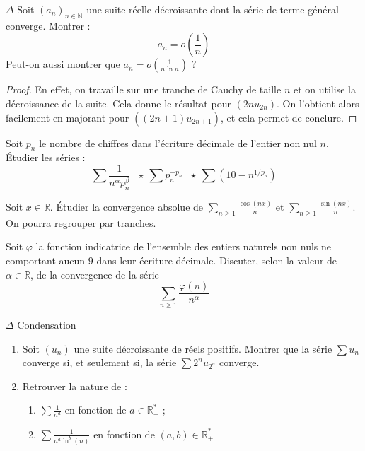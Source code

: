 \documentclass[french,a4paper]{article}
\newcommand{\N}{\mathbb{N}}
\newcommand{\R}{\mathbb{R}}
\newcommand{\st}{^*}
\theoremstyle{plain}
\theoremstyle{definition}
\theoremstyle{remark}
\begin{document}
\begin{ex}[Moulin.14]{$\Delta$} Soit $(a_n)_{n\in\N}$ une suite réelle décroissante dont la série de terme général converge. Montrer : $$a_n=o\left(\frac{1}{n}\right)$$ Peut-on aussi montrer que $a_n=\displaystyle o\left(\frac{1}{n\ln n}\right)$ ?
\end{ex}

\begin{proof}
	En effet, on travaille sur une tranche de Cauchy de taille $n$ et on utilise la décroissance de la suite. Cela donne le résultat pour $(2nu_{2n})$. On l'obtient alors facilement en majorant pour $((2n+1)u_{2n+1})$, et cela permet de conclure.
\end{proof}

\begin{ex}[Moulin.15]{}
	Soit $p_n$ le nombre de chiffres dans l'écriture décimale de l'entier non nul $n$. Étudier les séries : $$ \sum\frac{1}{n^\alpha p_n^\beta}\ \ \ \star\ \sum p_n^{-p_n}\ \ \ \star\ \sum\left(10-n^{1/p_n}\right)$$
\end{ex}

\begin{ex}[Moulin.16]{}
	Soit $x\in\R$. Étudier la convergence absolue de $\displaystyle\sum_{n\geqslant 1}\frac{\cos(nx)}{n}$ et $\displaystyle\sum_{n\geqslant 1}\frac{\sin(nx)}{n}$. On pourra regrouper par tranches.
\end{ex}

\begin{ex}[Moulin.17]{}
	Soit $\varphi$ la fonction indicatrice de l'ensemble des entiers naturels non nuls ne comportant aucun $9$ dans leur écriture décimale. Discuter, selon la valeur de $\alpha\in\R$, de la convergence de la série $$\sum_{n\geqslant 1}\frac{\varphi(n)}{n^\alpha}$$
\end{ex}

\begin{ex}[Moulin.18]{$\Delta$ Condensation}
	\begin{enumerate}
		\item Soit $(u_n)$ une suite décroissante de réels positifs. Montrer que la série $\sum u_n$ converge si, et seulement si, la série $\sum 2^nu_{2^n}$ converge.
		\item Retrouver la nature de :
		\begin{enumerate}
			\item $\displaystyle\sum\frac{1}{n^a}$ en fonction de $a\in\R_+\st$ ;
			\item $\displaystyle\sum\frac{1}{n^a\ln^b(n)}$ en fonction de $(a,b)\in\R_+\st$
		\end{enumerate}
	\end{enumerate}
\end{ex}
\end{document}
